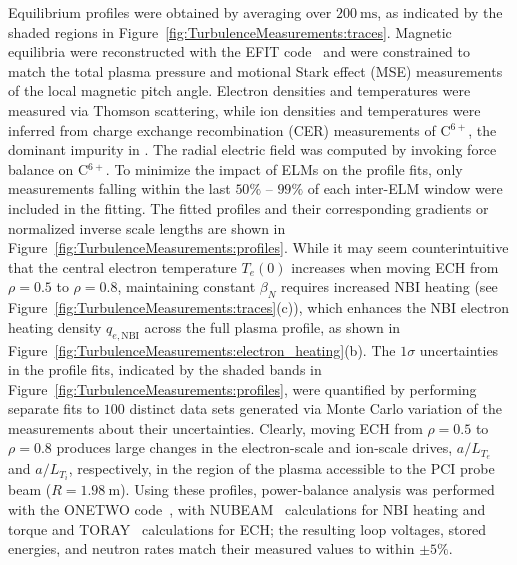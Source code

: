 Equilibrium profiles were obtained
by averaging over $\SI{200}{\milli\second}$,
as indicated by the shaded regions
in Figure~\ref{fig:TurbulenceMeasurements:traces}.
Magnetic equilibria were
reconstructed with the EFIT code~\cite{lao_fst05} and
were constrained to match the total plasma pressure and
motional Stark effect (MSE) measurements
of the local magnetic pitch angle.
Electron densities and temperatures
were measured via Thomson scattering, while
ion densities and temperatures
were inferred from charge exchange recombination (CER) measurements
of C$^{6+}$, the dominant impurity in \diiid.
The radial electric field was computed
by invoking force balance on C$^{6+}$.
To minimize the impact of ELMs on the profile fits,
only measurements falling
within the last {$50\%$ -- $99\%$} of each inter-ELM window
were included in the fitting.
The fitted profiles and
their corresponding gradients or
normalized inverse scale lengths
are shown in
Figure~\ref{fig:TurbulenceMeasurements:profiles}.
While it may seem counterintuitive
that the central electron temperature $T_e(0)$
increases when moving ECH from $\rho = 0.5$ to $\rho = 0.8$,
maintaining constant $\beta_N$
requires increased NBI heating
(see Figure~\ref{fig:TurbulenceMeasurements:traces}(c)),
which enhances the NBI electron heating density $q_{e,\text{NBI}}$
across the full plasma profile,
as shown in Figure~\ref{fig:TurbulenceMeasurements:electron_heating}(b).
The $1\sigma$ uncertainties in the profile fits,
indicated by the shaded bands in
Figure~\ref{fig:TurbulenceMeasurements:profiles},
were quantified by
performing separate fits to $100$ distinct data sets
generated via Monte Carlo variation
of the measurements about their uncertainties.
Clearly, moving ECH from $\rho = 0.5$ to $\rho = 0.8$
produces large changes
in the electron-scale and ion-scale drives,
$a / L_{T_e}$ and $a / L_{T_i}$, respectively,
in the region of the plasma accessible to the PCI probe beam
($R = \SI{1.98}{\meter}$).
Using these profiles,
power-balance analysis was performed
with the ONETWO code~\cite{pfeiffer_onetwo},
with NUBEAM~\cite{pankin_cpc04} calculations
for NBI heating and torque and
TORAY~\cite{matsuda_ieee89} calculations for ECH;
the resulting loop voltages, stored energies, and neutron rates
match their measured values to within $\pm 5\%$.

